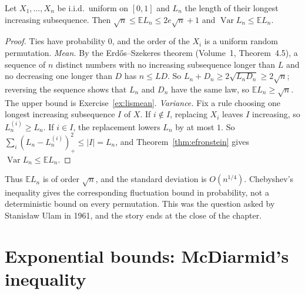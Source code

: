 \begin{proposition}\label{prop:lisvar}
Let $X_1,\dots,X_n$ be i.i.d.\ uniform on $[0,1]$ and $L_n$ the length of their longest increasing subsequence. Then $\sqrt n\le\mathbb EL_n\le2e\sqrt n+1$ and
$\operatorname{Var}L_n\le\mathbb EL_n$.
\end{proposition}
\begin{proof}
Ties have probability $0$, and the order of the $X_i$ is a uniform random permutation. \emph{Mean.} By the Erd\H os--Szekeres theorem (Volume~1, Theorem~4.5), a sequence of
$n$ distinct numbers with no increasing subsequence longer than $L$ and no decreasing one longer than $D$ has $n\le LD$. So $L_n+D_n\ge2\sqrt{L_nD_n}\ge2\sqrt n$; reversing
the sequence shows that $L_n$ and $D_n$ have the same law, so $\mathbb EL_n\ge\sqrt n$. The upper bound is Exercise~\ref{ex:lismean}.
\emph{Variance.} Fix a rule choosing one longest increasing subsequence $I$ of $X$. If $i\notin I$, replacing $X_i$ leaves $I$ increasing, so $L_n^{(i)}\ge L_n$. If $i\in I$, the
replacement lowers $L_n$ by at most $1$. So $\sum_i(L_n-L_n^{(i)})_+^2\le|I|=L_n$, and Theorem~\ref{thm:efronstein} gives $\operatorname{Var}L_n\le\mathbb EL_n$.
\end{proof}

Thus $\mathbb EL_n$ is of order $\sqrt n$, and the standard deviation is $O(n^{1/4})$. Chebyshev's inequality gives the corresponding fluctuation bound in probability, not a deterministic bound on every permutation. This was the question asked by Stanis\l aw Ulam in 1961, and the story ends at the close of
the chapter.

\section{Exponential bounds: McDiarmid's inequality}

